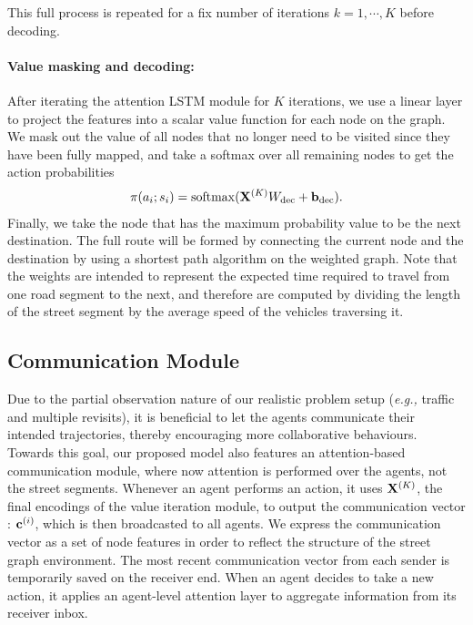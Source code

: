 This full process is repeated for a fix number of iterations $k=1, \cdots, K$ before decoding. %

\paragraph{Value masking and decoding:}
After iterating the attention LSTM module for $K$ iterations, we use a linear layer to project the
features into a scalar value function for each node on the graph. We mask out the value of all nodes
that no longer need to be visited since they have been fully mapped, and  take a softmax over
all remaining nodes to get the action probabilities
\begin{align}
\pi(a_i; s_i) = \mathop{\mathrm{softmax}}(\mathbf{X}^{(K)} W_{\mathrm{dec}} + \mathbf{b}_{\mathrm{dec}}).
\end{align}
Finally, we take the node that has the maximum probability value to be the next destination. The full route
will be formed by connecting the current node and the destination by using a shortest path algorithm on the weighted
graph. Note that the weights are intended to represent the expected time required to travel from one road segment to the next,
and therefore are computed by dividing the length of the street segment  by the average speed of the vehicles traversing it.

\subsection{Communication Module}
Due to the partial observation nature of our realistic problem setup (\textit{e.g.,} traffic and
multiple revisits), it is beneficial to let the agents communicate their intended trajectories, thereby
encouraging more collaborative behaviours. %
Towards this goal, our proposed model also features an
attention-based communication module, where now  attention is performed over the agents, not the street segments. %
Whenever an agent performs an action, it uses
$\mathbf{X}^{(K)}$, the final encodings of the value iteration module,
to output the communication vector
: $\mathbf{c}^{(i)}$, which is then broadcasted to all agents. We express the communication vector as a set of node
features in order to reflect the structure of the street graph environment.
The most recent communication vector
from each sender is temporarily saved on the receiver end. When an agent decides to take a new
action, it applies an agent-level attention layer to aggregate information from its receiver inbox.

